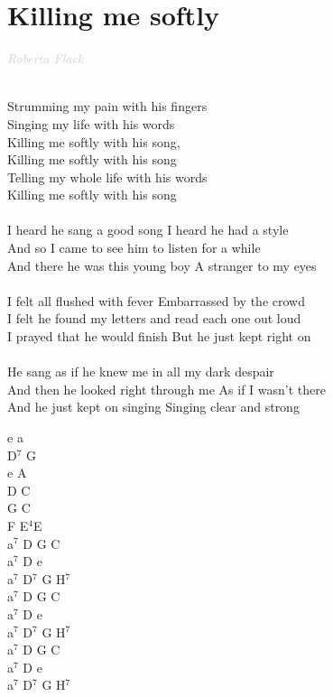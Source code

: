 \documentclass[a5paper, 10pt]{book}
\begin{document}
\section{Killing me softly}\textcolor{lightgray}{\textit{Roberta Flack}}\\~\\
\begin{minipage}[t]{0.75\textwidth}
  \hspace*{5mm}Strumming my pain with his fingers \\
  \hspace*{5mm}Singing my life with his words\\
  \hspace*{5mm}Killing me softly with his song, \\
  \hspace*{5mm}Killing me softly with his song \\
  \hspace*{5mm}Telling my whole life with his words \\
  \hspace*{5mm}Killing me softly with his song\\
  \\
  I heard he sang a good song I heard he had a style\\
  And so I came to see him to listen for a while\\
  And there he was this young boy A stranger to my eyes\\
  \\
  I felt all flushed with fever Embarrassed by the crowd\\
  I felt he found my letters and read each one out loud\\
  I prayed that he would finish But he just kept right on\\
  \\
  He sang as if he knew me in all my dark despair \\
  And then he looked right through me As if I wasn't there \\
  And he just kept on singing Singing clear and strong \\

\end{minipage}
\begin{minipage}[t]{0.25\textwidth}
  e a\\
  D$^7$ G\\
  e A\\
  D C\\
  G C\\
  F E$^4$E\\

  a$^7$ D G C\\
  a$^7$ D e\\
  a$^7$ D$^7$ G H$^7$\\

  a$^7$ D G C\\
  a$^7$ D e\\
  a$^7$ D$^7$ G H$^7$\\

  a$^7$ D G C\\
  a$^7$ D e\\
  a$^7$ D$^7$ G H$^7$\\
\end{minipage}
\end{document}
